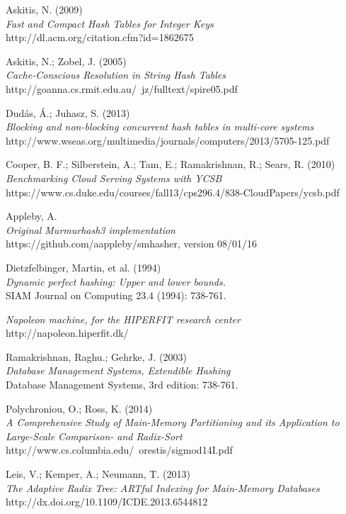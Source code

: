 \documentclass[11pt]{article} %
\begin{document}
\begin{thebibliography}{99}
 Askitis, N. (2009)\\
 \emph{Fast and Compact Hash Tables for Integer Keys}\\
 http://dl.acm.org/citation.cfm?id=1862675

 Askitis, N.; Zobel, J. (2005)\\
 \emph{Cache-Conscious Resolution in String Hash Tables}
 http://goanna.cs.rmit.edu.au/~jz/fulltext/spire05.pdf

 Dudás, Á.; Juhasz, S. (2013)\\
 \emph{Blocking and non-blocking concurrent hash tables in multi-core systems}\\
 http://www.wseas.org/multimedia/journals/computers/2013/5705-125.pdf

 Cooper, B. F.; Silberstein, A.; Tam, E.; Ramakrishnan, R.; Sears, R. (2010)\\
 \emph{Benchmarking Cloud Serving Systems with YCSB}\\
 https://www.cs.duke.edu/courses/fall13/cps296.4/838-CloudPapers/ycsb.pdf

 Appleby, A.\\
 \emph{Original Murmurhash3 implementation}\\
 https://github.com/aappleby/smhasher, version 08/01/16

 Dietzfelbinger, Martin, et al. (1994)\\
 \emph{Dynamic perfect hashing: Upper and lower bounds.}\\
 SIAM Journal on Computing 23.4 (1994): 738-761.

 \emph{Napoleon machine, for the HIPERFIT research center}\\
 http://napoleon.hiperfit.dk/

 Ramakrishnan, Raghu.; Gehrke, J. (2003)\\
 \emph{Database Management Systems, Extendible Hashing}\\
 Database Management Systems, 3rd edition: 738-761.

 Polychroniou, O.; Ross, K. (2014)\\
 \emph{A Comprehensive Study of Main-Memory Partitioning and its Application to Large-Scale Comparison- and Radix-Sort}\\
 http://www.cs.columbia.edu/~orestis/sigmod14I.pdf

 Leis, V.; Kemper, A.; Neumann, T. (2013)\\
 \emph{The Adaptive Radix Tree: ARTful Indexing for Main-Memory Databases}\\
 http://dx.doi.org/10.1109/ICDE.2013.6544812


\end{thebibliography}
\end{document}
